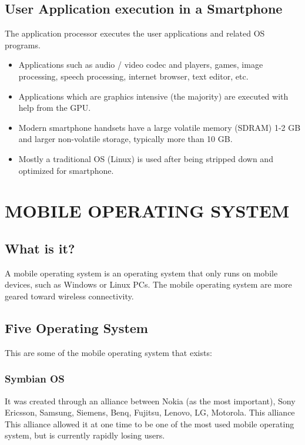 \documentclass[conference]{IEEEtran}
\begin{document}
\subsection{User Application execution in a Smartphone}
The application processor executes the user applications and related OS programs.
\begin{itemize}
    \item Applications such as audio / video codec and players, games, image processing, speech processing, internet browser, text editor, etc.
    \item Applications which are graphics intensive (the majority) are executed with help from the GPU.
    \item Modern smartphone handsets have a large volatile memory (SDRAM) 1-2 GB and larger non-volatile storage, typically more than 10 GB.
    \item Mostly a traditional OS (Linux) is used after being stripped down and optimized for smartphone.
\end{itemize}

\section{MOBILE OPERATING SYSTEM}

\subsection{What is it?}

A mobile operating system is an operating system that only runs on mobile devices, such as Windows or Linux PCs.
The mobile operating system are more geared toward wireless connectivity.

\subsection{Five Operating System}
This are some of the mobile operating system that exists:


\subsubsection{Symbian OS}\label{AA}
It was created through an alliance between Nokia (as the most important), Sony Ericsson, Samsung, Siemens, Benq, Fujitsu, Lenovo, LG, Motorola. This alliance This alliance allowed it at one time to be one of the most used mobile operating system, but is currently rapidly losing users.
\end{document}
